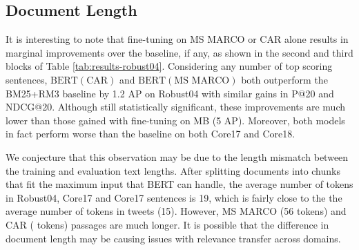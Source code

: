 \subsection{Document Length}

\begin{table*}[t!]
\centering{}
\caption{Ranking effectiveness on shortened MS MARCO and CAR evaluated on Robust04. }
\label{tab:results-chopped}
\end{table*}


It is interesting to note that fine-tuning on MS MARCO or CAR alone results in marginal improvements over the baseline, if any, as shown in the second and third blocks of Table \ref{tab:results-robust04}.
Considering any number of top scoring sentences, $ \textrm{BERT}(\textrm{CAR}) $ and $ \textrm{BERT}(\textrm{MS MARCO}) $ both outperform the BM25+RM3 baseline by 1.2 AP on Robust04 with similar gains in P@20 and NDCG@20.
Although still statistically significant, these improvements are much lower than those gained with fine-tuning on MB (5 AP).
Moreover, both models in fact perform worse than the baseline on both Core17 and Core18.

We conjecture that this observation may be due to the length mismatch between the training and evaluation text lengths.
After splitting documents into chunks that fit the maximum input that BERT can handle, the average number of tokens in Robust04, Core17 and Core17 sentences is 19, which is fairly close to the the average number of tokens in tweets (15).
However, MS MARCO (56 tokens) and CAR ( tokens) passages are much longer.
It is possible that the difference in document length may be causing issues with relevance transfer across domains.

